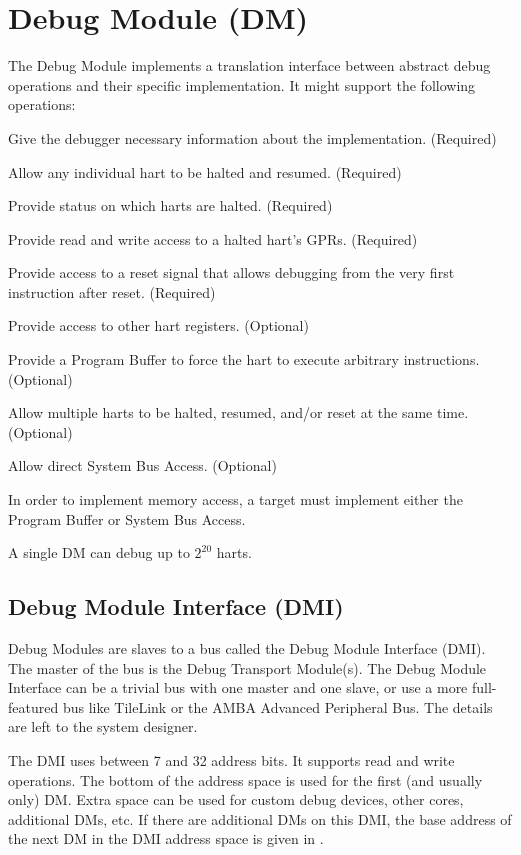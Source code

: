 \chapter{Debug Module (DM)} \label{dm}

\begin{steps}{The Debug Module implements a translation interface between abstract debug
    operations and their specific implementation. It might support the following
    operations:}
\item Give the debugger necessary information about the implementation. (Required)
\item Allow any individual hart to be halted and resumed. (Required)
\item Provide status on which harts are halted. (Required)
\item Provide read and write access to a halted hart's GPRs. (Required)
\item Provide access to a reset signal that allows debugging from the very
    first instruction after reset. (Required)
\item Provide access to other hart registers. (Optional)
\item Provide a Program Buffer to force the hart to execute arbitrary instructions. (Optional)
\item Allow multiple harts to be halted, resumed, and/or reset at the same time. (Optional)
\item Allow direct System Bus Access. (Optional)
\end{steps}

In order to implement memory access, a target must implement either the Program
Buffer or System Bus Access.

A single DM can debug up to $2^{20}$ harts.

\section{Debug Module Interface (DMI)} \label{dmi}

Debug Modules are slaves to a bus called the Debug Module Interface (DMI). The
master of the bus is the Debug Transport Module(s).
The Debug Module Interface can be a trivial bus with one master and one slave,
or use a more full-featured bus like TileLink or the AMBA Advanced Peripheral
Bus. The details are left to the system designer.

The DMI uses between 7 and 32 address bits.  It supports read and write
operations.  The bottom of the address space is
used for the first (and usually only) DM. Extra space can be used for custom
debug devices, other cores, additional DMs, etc. If there are additional DMs
on this DMI, the base address of the next DM in the DMI address space is given
in \Rnextdm.


